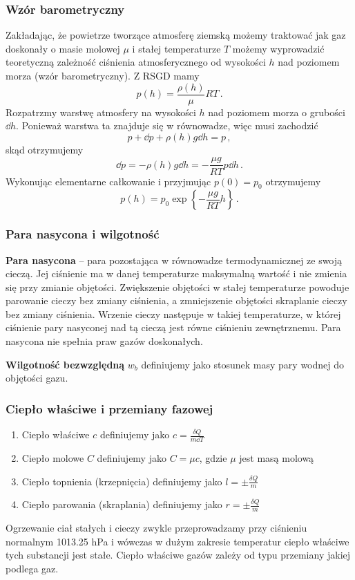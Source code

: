 \documentclass[../main.tex]{subfiles}
\begin{document}
\subsubsection{Wzór barometryczny}
Zakładając, że powietrze tworzące atmosferę ziemską możemy traktować jak gaz doskonały o masie molowej \(\mu\) i stałej temperaturze \(T\) możemy wyprowadzić teoretyczną zależność ciśnienia atmosferycznego od wysokości \(h\) nad poziomem morza (wzór barometryczny). Z RSGD mamy
\begin{equation*}
    p(h)=\frac{\rho(h)}{\mu}RT\,.
\end{equation*}
Rozpatrzmy warstwę atmosfery na wysokości \(h\) nad poziomem morza o grubości \(\dd{h}\). Ponieważ warstwa ta znajduje się w równowadze, więc musi zachodzić
\begin{equation*}
    p+\dd{p}+\rho(h) g\dd{h}=p\,,
\end{equation*}
skąd otrzymujemy
\begin{equation*}
    \dd{p}=-\rho(h) g\dd{h}=-\frac{\mu g}{RT}p\dd{h}\,.
\end{equation*}
Wykonując elementarne całkowanie i przyjmując \(p(0)=p_0\) otrzymujemy
\begin{equation*}
    p(h)=p_0\exp\left\{-\frac{\mu g}{RT}h\right\}\,.
\end{equation*}
\subsubsection{Para nasycona i wilgotność}
\textbf{Para nasycona} -- para pozostająca w równowadze termodynamicznej ze swoją cieczą. Jej ciśnienie ma w danej temperaturze maksymalną wartość i nie zmienia się przy zmianie objętości. Zwiększenie objętości w stałej temperaturze powoduje parowanie cieczy bez zmiany ciśnienia, a zmniejszenie objętości skraplanie cieczy bez zmiany ciśnienia. Wrzenie cieczy następuje w takiej temperaturze, w której ciśnienie pary nasyconej nad tą cieczą jest równe ciśnieniu zewnętrznemu. Para nasycona nie spełnia praw gazów doskonałych.
\medskip

\noindent\textbf{Wilgotność bezwzględną} \(w_b\) definiujemy jako stosunek masy pary wodnej do objętości gazu.

\subsubsection{Ciepło właściwe i przemiany fazowej}
\begin{enumerate}
    \item Ciepło właściwe \(c\) definiujemy jako \(c=\frac{\delta Q}{m\dd{T}}\)
    \item Ciepło molowe \(C\) definiujemy jako \(C=\mu c\), gdzie \(\mu\) jest masą molową
    \item Ciepło topnienia (krzepnięcia) definiujemy jako \(l=\pm\frac{\delta Q}{m}\)
    \item Ciepło parowania (skraplania) definiujemy jako  \(r=\pm\frac{\delta Q}{m}\)
\end{enumerate}
Ogrzewanie ciał stałych i cieczy zwykle przeprowadzamy przy ciśnieniu normalnym 1013.25 hPa i wówczas w dużym zakresie temperatur ciepło właściwe tych substancji jest stałe. Ciepło właściwe gazów zależy od typu przemiany jakiej podlega gaz.
\end{document}
